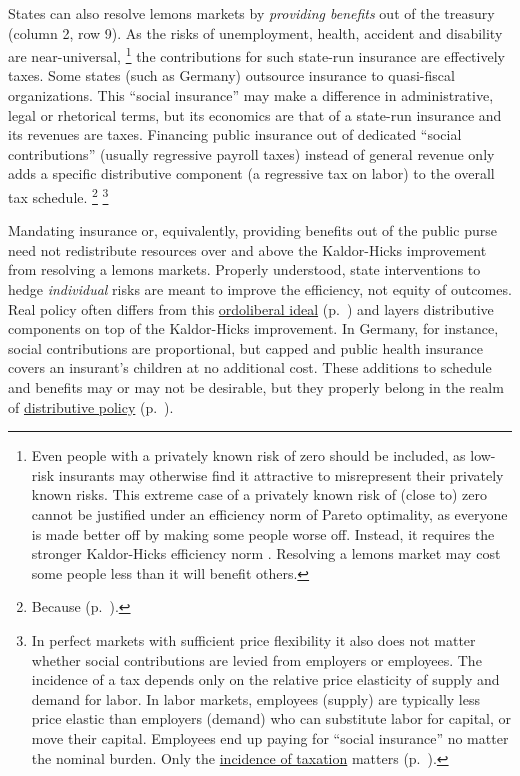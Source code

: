 States can also resolve lemons markets by \emph{providing benefits} out of the treasury (column 2, row 9).
As the risks of unemployment, health, accident and disability are near-universal,
\footnote{
	Even people with a privately known risk of zero should be included, as low-risk insurants may otherwise find it attractive to misrepresent their privately known risks.
	This extreme case of a privately known risk of (close to) zero cannot be justified under an efficiency norm of Pareto optimality, as everyone is made better off by making some people worse off.
	Instead, it requires the stronger Kaldor-Hicks efficiency norm \citep{Kaldor1939,Hicks1939}.
	Resolving a lemons market may cost some people less than it will benefit others.
}
the contributions for such state-run insurance are effectively taxes.
Some states (such as Germany) outsource insurance to quasi-fiscal organizations.
This ``social insurance'' may make a difference in administrative, legal or rhetorical terms, but its economics are that of a state-run insurance and its revenues are taxes.
Financing public insurance out of dedicated ``social contributions'' (usually regressive payroll taxes) instead of general revenue only adds a specific distributive component (a regressive tax on labor) to the overall tax schedule.
\footnote{
	Because  (p.~\pageref{sec:redistribution-and-revenue-are-one}).
}
\footnote{
	In perfect markets with sufficient price flexibility it also does not matter whether social contributions are levied from employers or employees.
	The incidence of a tax depends only on the relative price elasticity of supply and demand for labor.
	In labor markets, employees (supply) are typically less price elastic than employers (demand) who can substitute labor for capital, or move their capital.
	Employees end up paying for ``social insurance'' no matter the nominal burden.
	Only the \hyperref[sec:well-determined-incidence]{incidence of taxation} matters (p.~\pageref{sec:well-determined-incidence}).
}

Mandating insurance or, equivalently, providing benefits out of the public purse need not redistribute resources over and above the Kaldor-Hicks improvement from resolving a lemons markets.
Properly understood, state interventions to hedge \emph{individual} risks are meant to improve the efficiency, not equity of outcomes.
Real policy often differs from this \hyperref[sec:ordoliberal-hygiene]{ordoliberal ideal} (p.~\pageref{sec:ordoliberal-hygiene}) and layers distributive components on top of the Kaldor-Hicks improvement.
In Germany, for instance, social contributions are proportional, but capped and public health insurance covers an insurant's children at no additional cost.
These additions to schedule and benefits may or may not be desirable, but they properly belong in the realm of \hyperref[sec:distribution]{distributive policy} (p.~\pageref{sec:distribution}).

